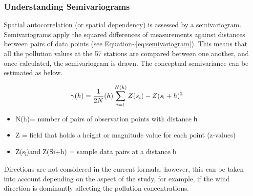 \hypertarget{understanding-semivariograms}{%
\subsubsection{Understanding
Semivariograms}\label{understanding-semivariograms}}

Spatial autocorrelation (or spatial dependency) is assessed by a
semivariogram. Semivariograms apply the squared differences of
measurements against distances between pairs of data points (see
Equation\textasciitilde{}\ref{eq:semivariogram}). This means that all
the pollution values at the 57 stations are compared between one
another, and once calculated, the semivariogram is drawn. The conceptual
semivariance can be estimated as below.

\begin{equation}
\label{eq:semivariogram}
\gamma(h)= \frac{1}{2N}(h) \sum_{i=1}^{N(h)}{Z(s_i) - Z(s\textsubscript{i} + h)\textsuperscript{2}}
\end{equation}

\begin{itemize}
 \setlength\itemsep{0em}
    \item N(h)= number of pairs of observation points with distance \texttt{h}
    \item Z = field that holds a height or magnitude value for each point (z-values)
    \item Z(s\textsubscript{i})and Z(Si+h) = sample data pairs at a distance \texttt{h} \citep{Luo2008}
\end{itemize}

Directions are not considered in the current formula; however, this can
be taken into account depending on the aspect of the study, for example,
if the wind direction is dominantly affecting the pollution
concentrations.

